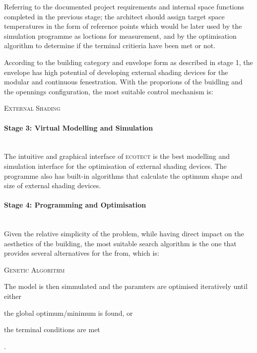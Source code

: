 Referring to the documented project requirements and internal space functions completed in the previous stage; the architect should assign target space temperatures in the form of reference points which would be later used by the simulation programme as loctions for measurement, and by the optimisation algorithm to determine if the terminal critieria have been met or not.

According to the building category and envelope form as described in stage 1, the envelope has high potential of developing external shading devices for the modular and continuous fenestration. With the proporions of the buidling and the opennings configuration, the most suitable control mechanism is:

\begin{compactenum}
	\item \textsc{External Shading}
\end{compactenum}

\paragraph{Stage 3: Virtual Modelling and Simulation}\mbox{}\\

The intuitive and graphical interface of \textsc{ecotect} is the best modelling and simulation interface for the optimisation of external shading devices. The programme also has built-in algorithms that calculate the optimum shape and size of external shading devices.

\paragraph{Stage 4: Programming and Optimisation}\mbox{}\\

Given the relative simplicity of the problem, while having direct impact on the aesthetics of the building, the most suitable search algorithm is the one that provides several alternatives for the from, which is:

\begin{compactenum}
\item \textsc{Genetic Algorithm}
\end{compactenum}

The model is then simmulated and the paramters are optimised iteratively until either \begin{inparaenum}[a)]\item the global optimum/minimum is found, or \item the terminal conditions are met\end{inparaenum}.


